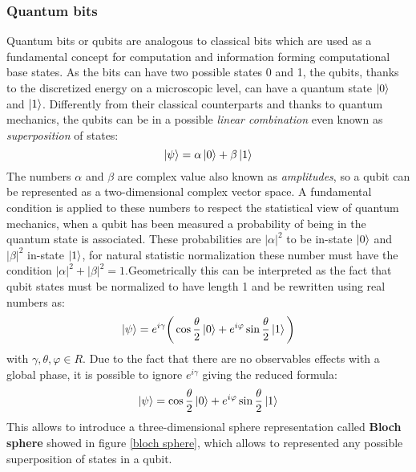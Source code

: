 \subsubsection{Quantum bits}
Quantum bits or qubits are analogous to classical bits which are used as a fundamental concept for computation and information forming computational base states. As the bits can have two possible states 0 and 1, the qubits, thanks to the discretized energy on a microscopic level, can have a quantum state $\ket{0}$ and $\ket{1}$. Differently from their classical counterparts and thanks to quantum mechanics, the qubits can be in a possible \textit{linear combination} even known as \textit{superposition} of states:
\begin{equation}\label{superposition}
	\ket{\psi} = \alpha \ket{0} + \beta \ket{1}
\end{equation}
The numbers $\alpha$ and $\beta$ are complex value also known as \textit{amplitudes}, so a qubit can be represented as a two-dimensional complex vector space. A fundamental condition is applied to these numbers to respect the statistical view of quantum mechanics, when a qubit has been measured a probability of being in the quantum state is associated. These probabilities are $|\alpha|^2$ to be in-state $\ket{0}$ and $|\beta|^2$ in-state $\ket{1}$, for natural statistic normalization these number must have the condition $|\alpha|^2 + |\beta|^2 = 1$.Geometrically this can be interpreted as the fact that qubit states must be normalized to have length 1 and be rewritten using real numbers as:
\begin{equation}
	\ket{\psi} = e^{i\gamma} \bigg( \cos{\frac{\theta}{2}} \ket{0} + e^{i\varphi} \sin{\frac{\theta}{2}} \ket{1}\bigg)
\end{equation}
with $\gamma, \theta, \varphi \in R$. Due to the fact that there are no observables effects with a global phase, it is possible to ignore $e^{i\gamma}$ giving the reduced formula:
\begin{equation}\label{angle qubits}
	\ket{\psi} = \cos{\frac{\theta}{2}} \ket{0} + e^{i\varphi} \sin{\frac{\theta}{2}} \ket{1}
\end{equation}
This allows to introduce a three-dimensional sphere representation called \textbf{Bloch sphere} showed in figure \ref{bloch sphere}, which allows to represented any possible superposition of states in a qubit.\\
